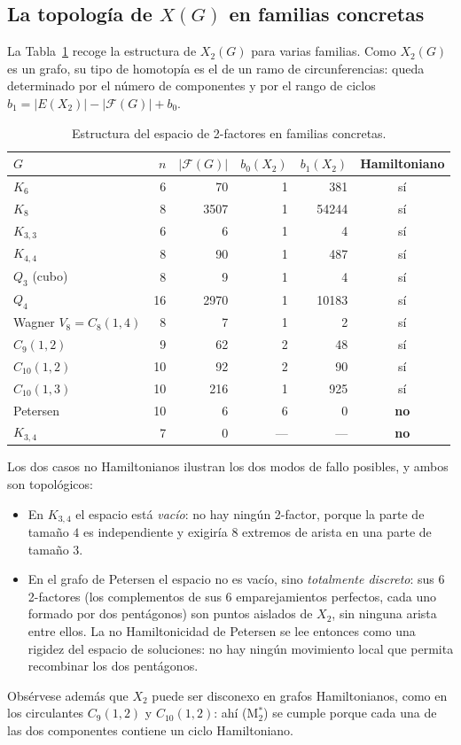 \documentclass[11pt,a4paper]{article}
\theoremstyle{definition}
\theoremstyle{remark}
\begin{document}
\subsection{La topología de $X(G)$ en familias concretas}\label{sub:familias}

La Tabla~\ref{tab:familias} recoge la estructura de $X_2(G)$ para varias familias. Como $X_2(G)$ es un grafo, su tipo de homotopía es el de un ramo de circunferencias: queda determinado por el número de componentes y por el rango de ciclos $b_1=|E(X_2)|-|\mathcal{F}(G)|+b_0$.

\begin{table}[h]
\centering
\begin{tabular}{lrrrrc}
\toprule
$G$ & $n$ & $|\mathcal{F}(G)|$ & $b_0(X_2)$ & $b_1(X_2)$ & Hamiltoniano\\
\midrule
$K_6$ & 6 & 70 & 1 & 381 & sí\\
$K_8$ & 8 & 3507 & 1 & 54244 & sí\\
$K_{3,3}$ & 6 & 6 & 1 & 4 & sí\\
$K_{4,4}$ & 8 & 90 & 1 & 487 & sí\\
$Q_3$ (cubo) & 8 & 9 & 1 & 4 & sí\\
$Q_4$ & 16 & 2970 & 1 & 10183 & sí\\
Wagner $V_8=C_8(1,4)$ & 8 & 7 & 1 & 2 & sí\\
$C_9(1,2)$ & 9 & 62 & 2 & 48 & sí\\
$C_{10}(1,2)$ & 10 & 92 & 2 & 90 & sí\\
$C_{10}(1,3)$ & 10 & 216 & 1 & 925 & sí\\
Petersen & 10 & 6 & 6 & 0 & \textbf{no}\\
$K_{3,4}$ & 7 & 0 & --- & --- & \textbf{no}\\
\bottomrule
\end{tabular}
\caption{Estructura del espacio de 2-factores en familias concretas.}\label{tab:familias}
\end{table}

Los dos casos no Hamiltonianos ilustran los dos modos de fallo posibles, y ambos son topológicos:
\begin{itemize}
\item En $K_{3,4}$ el espacio está \emph{vacío}: no hay ningún 2-factor, porque la parte de tamaño $4$ es independiente y exigiría $8$ extremos de arista en una parte de tamaño $3$.
\item En el grafo de Petersen el espacio no es vacío, sino \emph{totalmente discreto}: sus $6$ 2-factores (los complementos de sus $6$ emparejamientos perfectos, cada uno formado por dos pentágonos) son puntos aislados de $X_2$, sin ninguna arista entre ellos. La no Hamiltonicidad de Petersen se lee entonces como una rigidez del espacio de soluciones: no hay ningún movimiento local que permita recombinar los dos pentágonos.
\end{itemize}
Obsérvese además que $X_2$ puede ser disconexo en grafos Hamiltonianos, como en los circulantes $C_9(1,2)$ y $C_{10}(1,2)$: ahí (M$^*_2$) se cumple porque cada una de las dos componentes contiene un ciclo Hamiltoniano.
\end{document}
